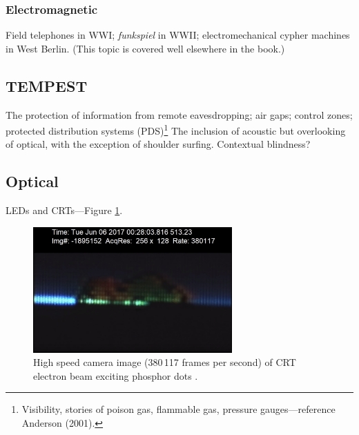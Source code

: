 \documentclass[a4paper,twoside,11pt]{book}
\begin{document}
\subsubsection{Electromagnetic}
Field telephones in WWI; \emph{funkspiel} in WWII; electromechanical cypher
machines in West Berlin. (This topic is covered well elsewhere in the book.)

\subsection{TEMPEST}
The protection of information from remote eavesdropping; air gaps; control
zones; protected distribution systems (PDS)\footnote{Visibility, stories of
poison gas, flammable gas, pressure gauges---reference Anderson (2001).} The
inclusion of acoustic but overlooking of optical, with the exception of
shoulder surfing. Contextual blindness?
\subsection{Optical}
LEDs and CRTs---Figure \ref{figure:slow-mo_guys_crt}.
\begin{figure}[ht]
  \centering
  \includegraphics[width=3in]{slow-mo_guys_crt.png}
  \caption{High speed camera image (380\,117 frames per second) of CRT electron
    beam exciting phosphor dots \protect\cite{Free2018}.}
  \label{figure:slow-mo_guys_crt}
\end{figure}
\end{document}
